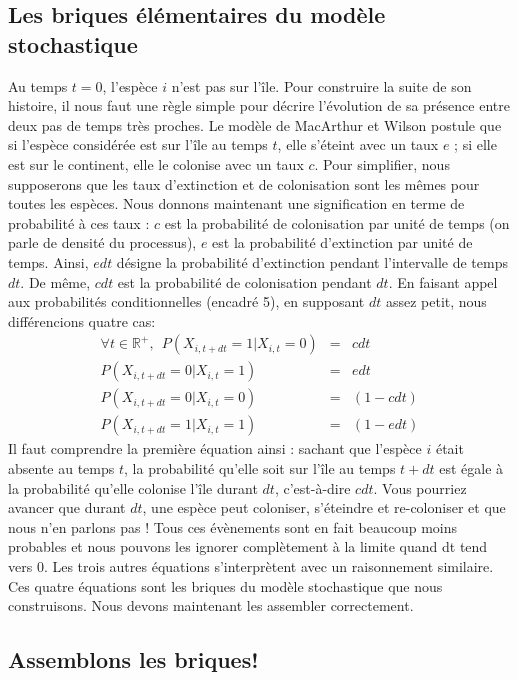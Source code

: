\subsection*{Les briques élémentaires du modèle stochastique}
Au temps $t=0$, l'espèce $i$ n'est pas sur l'île. Pour construire la suite de son histoire, il nous faut une règle simple pour décrire l'évolution de sa présence entre deux pas de temps très proches. Le modèle de MacArthur et Wilson postule que si l'espèce considérée est sur l'île au temps $t$, elle s'éteint avec un taux $e$ ; si elle est sur le continent, elle le colonise avec un taux $c$. Pour simplifier, nous supposerons que les taux d’extinction et de colonisation sont les mêmes pour toutes les espèces. Nous donnons maintenant une signification en terme de probabilité à ces taux : $c$ est la probabilité de colonisation par unité de temps (on parle de densité du processus), $e$ est la probabilité d'extinction par unité de temps. Ainsi, $edt$ désigne la probabilité d'extinction pendant l'intervalle de temps $dt$. De même, $cdt$ est la probabilité de colonisation pendant $dt$. En faisant appel aux probabilités conditionnelles (encadré 5), en supposant $dt$ assez petit, nous différencions quatre cas:
\begin{eqnarray}
 \label{eqAnnI3a}  \forall t \in \mathbb{R}^+, ~~P(X_{i,t+dt}=1|X_{i,t}=0)&=&cdt\\
 \label{eqAnnI3b} P(X_{i,t+dt}=0|X_{i,t}=1)&=&edt \\
 \label{eqAnnI3c} P(X_{i,t+dt}=0|X_{i,t}=0)&=&(1-cdt) \\
   \label{eqAnnI3d} P(X_{i,t+dt}=1|X_{i,t}=1)&=&(1-edt)
\end{eqnarray}
Il faut comprendre la première équation ainsi : sachant que l'espèce $i$ était absente au temps $t$, la probabilité qu'elle soit sur l'île au temps $t+dt$ est égale à la probabilité qu'elle colonise l'île durant $dt$, c'est-à-dire $cdt$. Vous pourriez avancer que durant $dt$, une espèce peut coloniser, s'éteindre et re-coloniser et que nous n'en parlons pas ! Tous ces évènements sont en fait beaucoup moins probables et nous pouvons les ignorer complètement à la limite quand dt tend vers 0. Les trois autres équations s'interprètent avec un raisonnement similaire. Ces quatre équations sont les briques du modèle stochastique que nous construisons. Nous devons maintenant les assembler correctement.


\subsection*{Assemblons les briques!}

